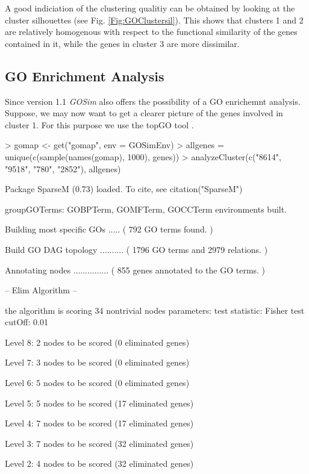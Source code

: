 \documentclass[12pt,a4paper]{article}
\begin{document}
A good indiciation of the clustering qualitiy can be obtained by looking at the cluster silhouettes \cite{rousseeuw87} (see Fig. \ref{Fig:GOClustersil}). This shows that clusters 1 and 2 are relatively homogenous with respect to the functional similarity of the genes contained in it, while the genes in cluster 3 are more dissimilar.

\subsection{GO Enrichment Analysis}

Since version 1.1 \emph{GOSim} also offers the possibility of a GO enrichemnt analysis. Suppose, we may now want to get a clearer picture of the genes involved in cluster 1. For this purpose we use the topGO tool \cite{Alexa2006topGO}.
\begin{Schunk}
\begin{Sinput}
> gomap <- get("gomap", env = GOSimEnv)
> allgenes = unique(c(sample(names(gomap), 1000), genes))
> analyzeCluster(c("8614", "9518", "780", "2852"), allgenes)
\end{Sinput}
\begin{Soutput}
Package SparseM (0.73) loaded.  To cite, see citation("SparseM")

groupGOTerms: 	GOBPTerm, GOMFTerm, GOCCTerm environments built.

Building most specific GOs .....	( 792 GO terms found. )

Build GO DAG topology ..........	( 1796 GO terms and 2979 relations. )

Annotating nodes ...............	( 855 genes annotated to the GO terms. )

			 -- Elim Algorithm -- 

		 the algorithm is scoring 34 nontrivial nodes
		 parameters: 
			 test statistic:  Fisher test 
			 cutOff:  0.01 

	 Level 8:	2 nodes to be scored	(0 eliminated genes)

	 Level 7:	3 nodes to be scored	(0 eliminated genes)

	 Level 6:	5 nodes to be scored	(0 eliminated genes)

	 Level 5:	5 nodes to be scored	(17 eliminated genes)

	 Level 4:	7 nodes to be scored	(17 eliminated genes)

	 Level 3:	7 nodes to be scored	(32 eliminated genes)

	 Level 2:	4 nodes to be scored	(32 eliminated genes)


\end{Soutput}
\end{Schunk}
\end{document}

